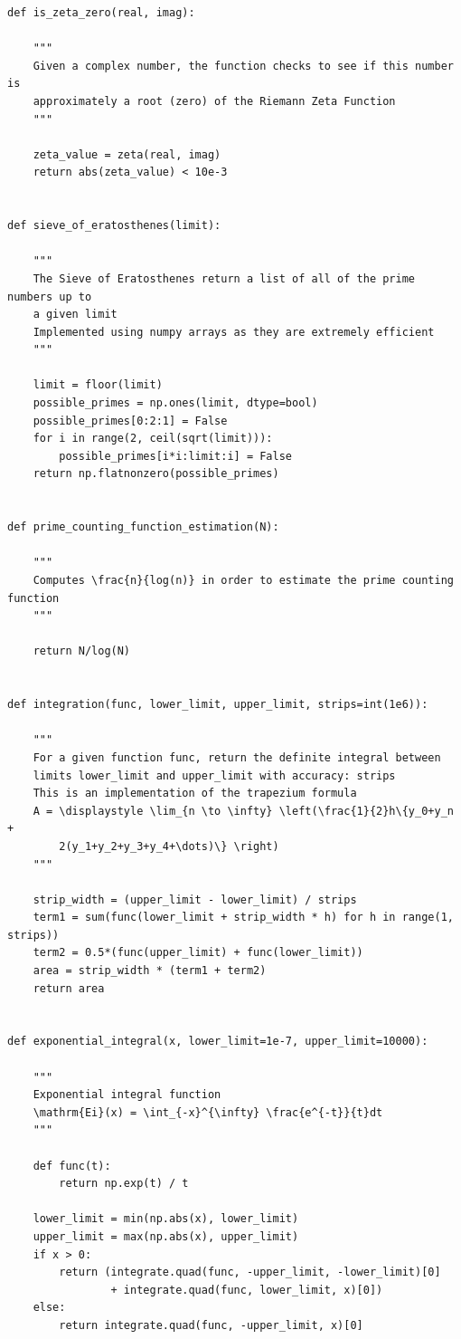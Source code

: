 \documentclass[12pt]{article}
\begin{document}
\begin{lstlisting}
def is_zeta_zero(real, imag):

    """
    Given a complex number, the function checks to see if this number is
    approximately a root (zero) of the Riemann Zeta Function
    """

    zeta_value = zeta(real, imag)
    return abs(zeta_value) < 10e-3


def sieve_of_eratosthenes(limit):

    """
    The Sieve of Eratosthenes return a list of all of the prime numbers up to
    a given limit
    Implemented using numpy arrays as they are extremely efficient
    """

    limit = floor(limit)
    possible_primes = np.ones(limit, dtype=bool)
    possible_primes[0:2:1] = False
    for i in range(2, ceil(sqrt(limit))):
        possible_primes[i*i:limit:i] = False
    return np.flatnonzero(possible_primes)


def prime_counting_function_estimation(N):

    """
    Computes \frac{n}{log(n)} in order to estimate the prime counting function
    """

    return N/log(N)


def integration(func, lower_limit, upper_limit, strips=int(1e6)):

    """
    For a given function func, return the definite integral between
    limits lower_limit and upper_limit with accuracy: strips
    This is an implementation of the trapezium formula
    A = \displaystyle \lim_{n \to \infty} \left(\frac{1}{2}h\{y_0+y_n +
        2(y_1+y_2+y_3+y_4+\dots)\} \right)
    """

    strip_width = (upper_limit - lower_limit) / strips
    term1 = sum(func(lower_limit + strip_width * h) for h in range(1, strips))
    term2 = 0.5*(func(upper_limit) + func(lower_limit))
    area = strip_width * (term1 + term2)
    return area


def exponential_integral(x, lower_limit=1e-7, upper_limit=10000):

    """
    Exponential integral function
    \mathrm{Ei}(x) = \int_{-x}^{\infty} \frac{e^{-t}}{t}dt
    """

    def func(t):
        return np.exp(t) / t

    lower_limit = min(np.abs(x), lower_limit)
    upper_limit = max(np.abs(x), upper_limit)
    if x > 0:
        return (integrate.quad(func, -upper_limit, -lower_limit)[0]
                + integrate.quad(func, lower_limit, x)[0])
    else:
        return integrate.quad(func, -upper_limit, x)[0]



\end{lstlisting}
\end{document}
